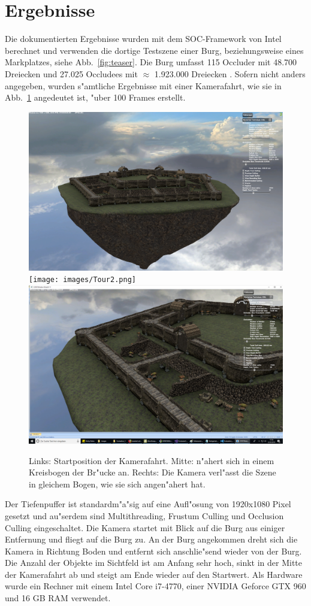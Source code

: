 \documentclass[journal]{vgtc}
\begin{document}
\section{Ergebnisse}
Die dokumentierten Ergebnisse wurden mit dem SOC-Framework von Intel berechnet und verwenden die dortige Testszene einer Burg, beziehungsweise eines Markplatzes, siehe Abb.\ \ref{fig:teaser}.
Die Burg umfasst 115 Occluder mit 48.700 Dreiecken und 27.025 Occludees mit $\approx$ 1.923.000 Dreiecken \cite{SOCF}.
Sofern nicht anders angegeben, wurden s"amtliche Ergebnisse mit einer Kamerafahrt, wie sie in Abb.\ \ref{fig:fahrt} angedeutet ist, "uber 100 Frames erstellt.
\begin{figure}%
\includegraphics[width=0.33\columnwidth]{images/Tour1.png}%
\texttt{[image: images/Tour2.png]}%
\includegraphics[width=0.33\columnwidth]{images/Tour3.png}%
\caption{Links: Startposition der Kamerafahrt. Mitte: n"ahert sich in einem Kreisbogen der Br"ucke an. Rechts: Die Kamera verl"asst die Szene in gleichem Bogen, wie sie sich angen"ahert hat.}%
\label{fig:fahrt}%
\end{figure}
Der Tiefenpuffer ist standardm"a"sig auf eine Aufl"osung von 1920x1080 Pixel gesetzt und au"serdem sind Multithreading, Frustum Culling und Occlusion Culling eingeschaltet.
Die Kamera startet mit Blick auf die Burg aus einiger Entfernung und fliegt auf die Burg zu.
An der Burg angekommen dreht sich die Kamera in Richtung Boden und entfernt sich anschlie"send wieder von der Burg.
Die Anzahl der Objekte im Sichtfeld ist am Anfang sehr hoch, sinkt in der Mitte der Kamerafahrt ab und steigt am Ende wieder auf den Startwert.
Als Hardware wurde ein Rechner mit einem Intel Core i7-4770, einer NVIDIA Geforce GTX 960 und 16 GB RAM verwendet.\\
\end{document}
